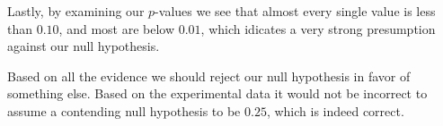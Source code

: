 \documentclass[10pt]{report}\usepackage[]{graphicx}\usepackage[]{xcolor}
\begin{document}
\begin{easylist}[enumerate]
        Lastly, by examining our $p$-values we see that almost every single value is less than $0.10$, and most are
        below $0.01$, which idicates a very strong presumption against our null hypothesis.\newline

        Based on all the evidence we should reject our null hypothesis in favor of something else. Based on the
        experimental data it would not be incorrect to assume a contending null hypothesis to be $0.25$, which is indeed
        correct.

    \end{easylist}
\end{document}
